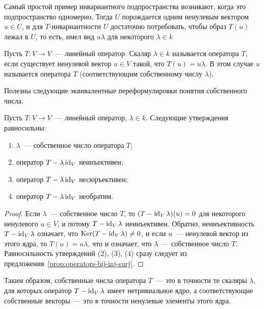 Самый простой пример инвариантного подпространства возникают, когда
это подпространство одномерно. Тогда $U$ порождается одним ненулевым
вектором $u\in U$, и для $T$-инвариантности $U$ достаточно потребовать,
чтобы образ $T(u)$ лежал в $U$, то есть, имел вид $u\lambda$ для
некоторого $\lambda\in k$
\begin{definition}
Пусть $T\colon V\to V$~--- линейный оператор.
Скаляр $\lambda\in k$ называется  оператора
$T$, если существует ненулевой вектор $u\in V$ такой, что
$T(u) = u\lambda$. В этом случае $u$ называется
 оператора $T$ (соответствующим
собственному числу $\lambda$).
\end{definition}
Полезны следующие эквивалентные переформулировки понятия
собственного числа.
\begin{proposition}\label{prop:eigenvalue-alternative-defs}
Пусть $T\colon V\to V$~--- линейный оператор, $\lambda\in k$.
Следующие утверждения равносильны:
\begin{enumerate}
\item $\lambda$~--- собственное число оператора $T$;
\item оператор $T-\lambda\operatorname{id}_V$ неинъективен;
\item оператор $T-\lambda\operatorname{id}_V$ несюръективен;
\item оператор $T-\lambda\operatorname{id}_V$ необратим.
\end{enumerate}
\end{proposition}
\begin{proof}
Если $\lambda$~--- собственное число $T$, то $(T-\operatorname{id}_V\lambda)(u)=0$
для некоторого ненулевого $u\in V$, и потому $T-\operatorname{id}_V\lambda$
неинъективен. Обратно, неинъективность $T-\operatorname{id}_V\lambda$ означает,
что $\operatorname{Ker}(T-\operatorname{id}_V\lambda)\neq 0$, и если $u$~--- ненулевой вектор из
этого ядра, то $T(u) = u\lambda$, что и означает, что $\lambda$~---
собственное число $T$.
Равносильность утверждений (2), (3), (4) сразу следует из
предложения~\ref{prop:operators-bij-inj-surj}.
\end{proof}
Таким образом, собственные числа оператора $T$~--- это в точности
те скаляры $\lambda$, для которых оператор $T-\operatorname{id}_V\lambda$
имеет нетривиальное ядро, а соответствующие собственные векторы~---
это в точности ненулевые элементы этого ядра.

